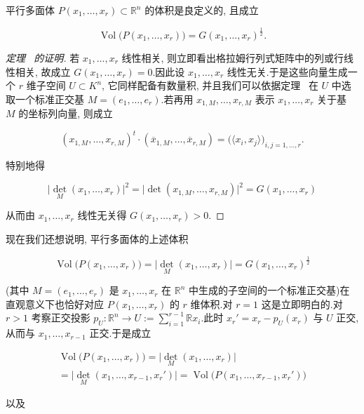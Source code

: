 \begin{corollary}[平行多面体的体积]\label{cor:7.2.10}
平行多面体 $P(x_1, \ldots, x_r) \subset \mathbb{R}^n$ 的体积是良定义的, 且成立

\[
\operatorname{Vol}\bigl(P(x_1, \ldots, x_r)\bigr) = G(x_1, \ldots, x_r)^{\frac{1}{2}}\text{.}
\]
\end{corollary}

\begin{proof}[定理~ 的证明]
若 $x_1, \ldots, x_r$ 线性相关, 则立即看出格拉姆行列式矩阵中的列或行线性相关, 故成立 $G(x_1, \ldots, x_r) = 0$.因此设 $x_1, \ldots, x_r$ 线性无关.于是这些向量生成一个 $r$ 维子空间 $U \subset K^n$, 它同样配备有数量积, 并且我们可以依据定理~ 在 $U$ 中选取一个标准正交基 $M = (e_1, \ldots, e_r)$.若再用 $x_{1, M}, \ldots, x_{r, M}$ 表示 $x_1, \ldots, x_r$ 关于基 $M$ 的坐标列向量, 则成立

\[
(x_{1, M}, \ldots, x_{r, M})^t \cdot (\overline{x}_{1, M}, \ldots, \overline{x}_{r, M}) = \bigl(\langle x_i, x_j \rangle\bigr)_{i, j = 1, \ldots, r}\text{.}
\]

特别地得

\[
\bigl|\det_M(x_1, \ldots, x_r)\bigr|^2 = \bigl|\det(x_{1, M}, \ldots, x_{r, M})\bigr|^2 = G(x_1, \ldots, x_r)
\]

从而由 $x_1, \ldots, x_r$ 线性无关得 $G(x_1, \ldots, x_r) > 0$.
\end{proof}

现在我们还想说明, 平行多面体的上述体积

\[
\operatorname{Vol}\bigl(P(x_1, \ldots, x_r)\bigr) = \bigl|\det_M(x_1, \ldots, x_r)\bigr| = G(x_1, \ldots, x_r)^{\frac{1}{2}}
\]

(其中 $M = (e_1, \ldots, e_r)$ 是 $x_1, \ldots, x_r$ 在 $\mathbb{R}^n$ 中生成的子空间的一个标准正交基)在直观意义下也恰好对应 $P(x_1, \ldots, x_r)$ 的 $r$ 维体积.对 $r = 1$ 这是立即明白的.对 $r > 1$ 考察正交投影 $p_U \colon \mathbb{R}^n \longrightarrow U := \sum_{i = 1}^{r-1} \mathbb{R} x_i$.此时 $x_r' = x_r - p_U(x_r)$ 与 $U$ 正交, 从而与 $x_1, \ldots, x_{r-1}$ 正交.于是成立

\[
\begin{array}{c}
\operatorname{Vol}\bigl(P(x_1, \ldots, x_r)\bigr) = \bigl|\det_M(x_1, \ldots, x_r)\bigr| \\
= \bigl|\det_M(x_1, \ldots, x_{r-1}, x_r')\bigr| = \operatorname{Vol}\bigl(P(x_1, \ldots, x_{r-1}, x_r')\bigr)
\end{array}
\]

以及

